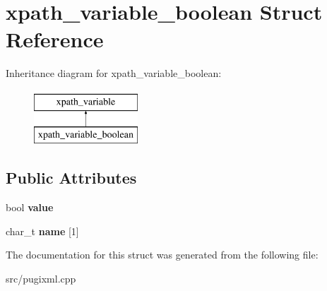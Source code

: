 \hypertarget{structxpath__variable__boolean}{}\section{xpath\+\_\+variable\+\_\+boolean Struct Reference}
\label{structxpath__variable__boolean}
Inheritance diagram for xpath\+\_\+variable\+\_\+boolean\+:\begin{figure}[H]
\begin{center}
\leavevmode
\includegraphics[height=2.000000cm]{structxpath__variable__boolean}
\end{center}
\end{figure}
\subsection*{Public Attributes}
\begin{DoxyCompactItemize}
\item 
\mbox{\label{structxpath__variable__boolean_ab54117a6cced8c3e029724651df4d404}} 
bool {\bfseries value}
\item 
\mbox{\label{structxpath__variable__boolean_a2b2cb81ee5c9a19a667428d08d5bb951}} 
char\+\_\+t {\bfseries name} \mbox{[}1\mbox{]}
\end{DoxyCompactItemize}


The documentation for this struct was generated from the following file\+:\begin{DoxyCompactItemize}
\item 
src/pugixml.\+cpp\end{DoxyCompactItemize}
